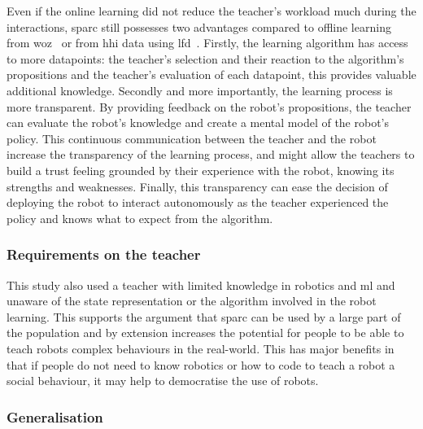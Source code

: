 Even if the online learning did not reduce the teacher's workload much during the interactions, \gls{sparc} still possesses two advantages compared to offline learning from \gls{woz}~\citep{sequeira2016discovering} or from \gls{hhi} data using \gls{lfd}~\citep{liu2014train}. Firstly, the learning algorithm has access to more datapoints: the teacher's selection and their reaction to the algorithm's propositions and the teacher's evaluation of each datapoint, this provides valuable additional knowledge. Secondly and more importantly, the learning process is more transparent. By providing feedback on the robot's propositions, the teacher can evaluate the robot's knowledge and create a mental model of the robot's policy. This continuous communication between the teacher and the robot increase the transparency of the learning process, and might allow the teachers to build a trust feeling grounded by their experience with the robot, knowing its strengths and weaknesses. Finally, this transparency can ease the decision of deploying the robot to interact autonomously as the teacher experienced the policy and knows what to expect from the algorithm.

\subsubsection{Requirements on the teacher}

This study also used a teacher with limited knowledge in robotics and \gls{ml} and unaware of the state representation or the algorithm involved in the robot learning. This supports the argument that \gls{sparc} can be used by a large part of the population and by extension increases the potential for people to be able to teach robots complex behaviours in the real-world. This has major benefits in that if people do not need to know robotics or how to code to teach a robot a social behaviour, it may help to democratise the use of robots. 


\subsubsection{Generalisation}


